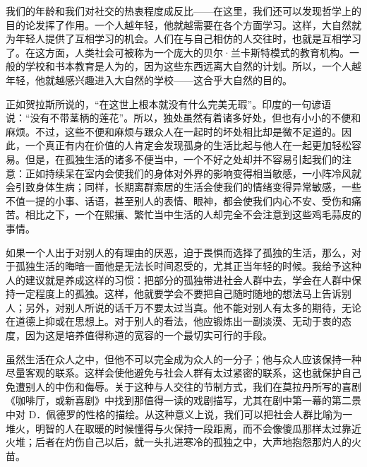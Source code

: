 \documentclass[11pt,oneside]{article}
\begin{document}
\begin{common-format}
我们的年龄和我们对社交的热衷程度成反比——在这里，我们还可以发现哲学上的目的论发挥了作用。一个人越年轻，他就越需要在各个方面学习。这样，大自然就为年轻人提供了互相学习的机会。人们在与自己相仿的人交往时，也就是互相学习了。在这方面，人类社会可被称为一个庞大的贝尔·兰卡斯特模式的教育机构。一般的学校和书本教育是人为的，因为这些东西远离大自然的计划。所以，一个人越年轻，他就越感兴趣进入大自然的学校——这合乎大自然的目的。 

正如贺拉斯所说的，“在这世上根本就没有什么完美无瑕”。印度的一句谚语说：“没有不带茎柄的莲花”。所以，独处虽然有着诸多好处，但也有小小的不便和麻烦。不过，这些不便和麻烦与跟众人在一起时的坏处相比却是微不足道的。因此，一个真正有内在价值的人肯定会发现孤身的生活比起与他人在一起更加轻松容易。但是，在孤独生活的诸多不便当中，一个不好之处却并不容易引起我们的注意：正如持续呆在室内会使我们的身体对外界的影响变得相当敏感，一小阵冷风就会引致身体生病；同样，长期离群索居的生活会使我们的情绪变得异常敏感，一些不值一提的小事、话语，甚至别人的表情、眼神，都会使我们内心不安、受伤和痛苦。相比之下，一个在熙攘、繁忙当中生活的人却完全不会注意到这些鸡毛蒜皮的事情。 

如果一个人出于对别人的有理由的厌恶，迫于畏惧而选择了孤独的生活，那么，对于孤独生活的晦暗一面他是无法长时间忍受的，尤其正当年轻的时候。我给予这种人的建议就是养成这样的习惯：把部分的孤独带进社会人群中去，学会在人群中保持一定程度上的孤独。这样，他就要学会不要把自己随时随地的想法马上告诉别人；另外，对别人所说的话千万不要太过当真。他不能对别人有太多的期待，无论在道德上抑或在思想上。对于别人的看法，他应锻炼出一副淡漠、无动于衷的态度，因为这是培养值得称道的宽容的一个最切实可行的手段。 

虽然生活在众人之中，但他不可以完全成为众人的一分子；他与众人应该保持一种尽量客观的联系。这样会使他避免与社会人群有太过紧密的联系，这也就保护自己免遭别人的中伤和侮辱。关于这种与人交往的节制方式，我们在莫拉丹所写的喜剧《咖啡厅，或新喜剧》中找到那值得一读的戏剧描写，尤其在剧中第一幕的第二景中对 D．佩德罗的性格的描绘。从这种意义上说，我们可以把社会人群比喻为一堆火，明智的人在取暖的时候懂得与火保持一段距离，而不会像傻瓜那样太过靠近火堆；后者在灼伤自己以后，就一头扎进寒冷的孤独之中，大声地抱怨那灼人的火苗。





\end{common-format}
\end{document}
